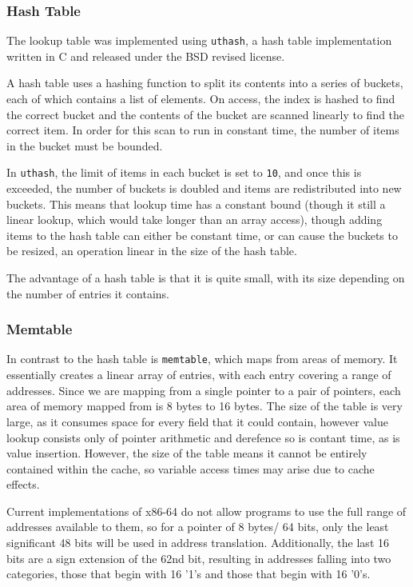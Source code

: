 \subsubsection{Hash Table}

The lookup table was implemented using \verb!uthash!, a hash table implementation written in C and released under the BSD revised license. 

A hash table uses a hashing function to split its contents into a series of buckets, each of which contains a list of elements.
On access, the index is hashed to find the correct bucket and the contents of the bucket are scanned linearly to find the correct item.
In order for this scan to run in constant time, the number of items in the bucket must be bounded.

In \verb!uthash!, the limit of items in each bucket is set to \verb!10!, and once this is exceeded, the number of buckets is doubled and items are redistributed into new buckets.
This means that lookup time has a constant bound (though it still a linear lookup, which would take longer than an array access), though adding items to the hash table can either be constant time, or can cause the buckets to be resized, an operation linear in the size of the hash table.

The advantage of a hash table is that it is quite small, with its size depending on the number of entries it contains.

\subsubsection{Memtable}

In contrast to the hash table is \verb!memtable!, which maps from areas of memory.
It essentially creates a linear array of entries, with each entry covering a range of addresses.
Since we are mapping from a single pointer to a pair of pointers, each area of memory mapped from is 8 bytes to 16 bytes.
The size of the table is very large, as it consumes space for every field that it could contain, however value lookup consists only of pointer arithmetic and derefence so is contant time, as is value insertion.
However, the size of the table means it cannot be entirely contained within the cache, so variable access times may arise due to cache effects.

Current implementations of x86-64 do not allow programs to use the full range of addresses available to them, so for a pointer of 8 bytes/ 64 bits, only the least significant 48 bits will be used in address translation.
Additionally, the last 16 bits are a sign extension of the 62nd bit, resulting in addresses falling into two categories, those that begin with 16 '1's and those that begin with 16 '0's.

